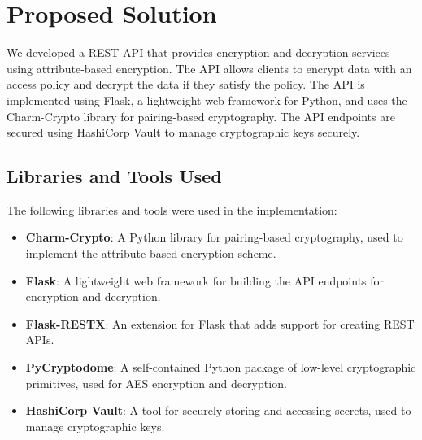 \documentclass[cic,tc,english]{iiufrgs}
\begin{document}

\chapter{Proposed Solution}
    \label{proposedsolution}
    We developed a REST API that provides encryption and decryption services using attribute-based encryption. The API allows clients to encrypt data with an access policy and decrypt the data if they satisfy the policy. The API is implemented using Flask, a lightweight web framework for Python, and uses the Charm-Crypto library for pairing-based cryptography. The API endpoints are secured using HashiCorp Vault to manage cryptographic keys securely.

    \section{Libraries and Tools Used}

    The following libraries and tools were used in the implementation:

    \begin{itemize}
        \item \textbf{Charm-Crypto}: A Python library for pairing-based cryptography, used to implement the attribute-based encryption scheme.
        \item \textbf{Flask}: A lightweight web framework for building the API endpoints for encryption and decryption.
        \item \textbf{Flask-RESTX}: An extension for Flask that adds support for creating REST APIs.
        \item \textbf{PyCryptodome}: A self-contained Python package of low-level cryptographic primitives, used for AES encryption and decryption.
        \item \textbf{HashiCorp Vault}: A tool for securely storing and accessing secrets, used to manage cryptographic keys.
    \end{itemize}
\end{document}
